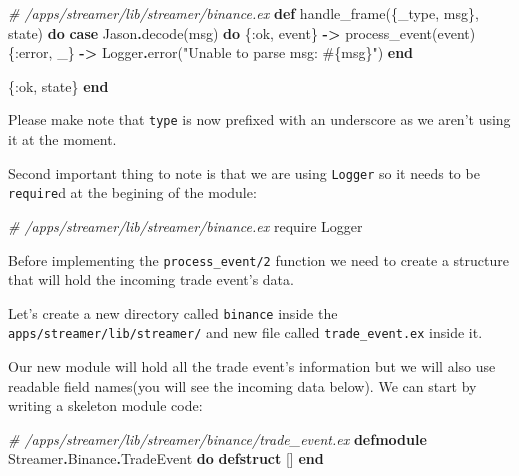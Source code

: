 \documentclass[
  oneside]{book}
\newenvironment{Shaded}{\begin{snugshade}}{\end{snugshade}}
\newcommand{\CommentTok}[1]{\textcolor[rgb]{0.56,0.35,0.01}{\textit{#1}}}
\newcommand{\ConstantTok}[1]{\textcolor[rgb]{0.00,0.00,0.00}{#1}}
\newcommand{\ImportTok}[1]{#1}
\newcommand{\KeywordTok}[1]{\textcolor[rgb]{0.13,0.29,0.53}{\textbf{#1}}}
\newcommand{\NormalTok}[1]{#1}
\newcommand{\OperatorTok}[1]{\textcolor[rgb]{0.81,0.36,0.00}{\textbf{#1}}}
\newcommand{\OtherTok}[1]{\textcolor[rgb]{0.56,0.35,0.01}{#1}}
\newcommand{\StringTok}[1]{\textcolor[rgb]{0.31,0.60,0.02}{#1}}
\newcommand{\VariableTok}[1]{\textcolor[rgb]{0.00,0.00,0.00}{#1}}
\begin{document}
\begin{Shaded}
\begin{Highlighting}[]
  \CommentTok{\# /apps/streamer/lib/streamer/binance.ex}
  \KeywordTok{def}\NormalTok{ handle\_frame(\{\_type, msg\}, state) }\KeywordTok{do}
    \KeywordTok{case} \ConstantTok{Jason}\OperatorTok{.}\NormalTok{decode(msg) }\KeywordTok{do}
\NormalTok{      \{}\VariableTok{:ok}\NormalTok{, event\} }\OperatorTok{{-}\textgreater{}}\NormalTok{ process\_event(event)}
\NormalTok{      \{}\VariableTok{:error}\NormalTok{, \_\} }\OperatorTok{{-}\textgreater{}} \ConstantTok{Logger}\OperatorTok{.}\NormalTok{error(}\StringTok{"Unable to parse msg: }\OtherTok{\#\{}\NormalTok{msg}\OtherTok{\}}\StringTok{"}\NormalTok{)}
    \KeywordTok{end}

\NormalTok{    \{}\VariableTok{:ok}\NormalTok{, state\}}
  \KeywordTok{end}
\end{Highlighting}
\end{Shaded}

Please make note that \texttt{type} is now prefixed with an underscore as we aren't using it at the moment.

Second important thing to note is that we are using \texttt{Logger} so it needs to be \texttt{require}d at the begining of the module:

\begin{Shaded}
\begin{Highlighting}[]
  \CommentTok{\# /apps/streamer/lib/streamer/binance.ex}
  \ImportTok{require} \ConstantTok{Logger}
\end{Highlighting}
\end{Shaded}

Before implementing the \texttt{process\_event/2} function we need to create a structure that will hold the incoming trade event's data.

Let's create a new directory called \texttt{binance} inside the \texttt{apps/streamer/lib/streamer/} and new file called \texttt{trade\_event.ex} inside it.

Our new module will hold all the trade event's information but we will also use readable field names(you will see the incoming data below). We can start by writing a skeleton module code:

\begin{Shaded}
\begin{Highlighting}[]
\CommentTok{\# /apps/streamer/lib/streamer/binance/trade\_event.ex}
\KeywordTok{defmodule} \ConstantTok{Streamer}\OperatorTok{.}\ConstantTok{Binance}\OperatorTok{.}\ConstantTok{TradeEvent} \KeywordTok{do}
    \KeywordTok{defstruct}\NormalTok{ []}
\KeywordTok{end}
\end{Highlighting}
\end{Shaded}
\end{document}

